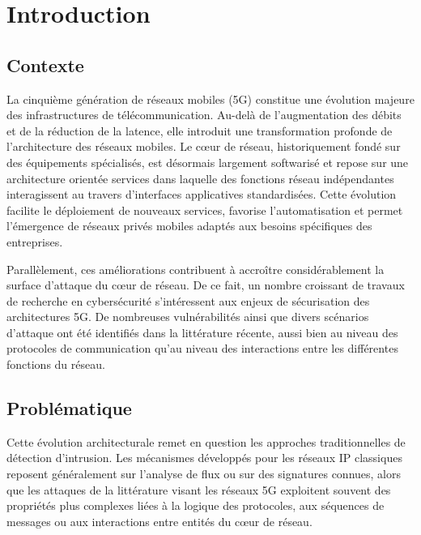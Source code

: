 \documentclass[a4paper,11pt,twoside]{StyleThese}
\begin{document}
\fi


\chapter*{Introduction}
\setcounter{chapter}{0}
\setcounter{section}{0}


\section*{Contexte}
La cinquième génération de réseaux mobiles (5G) constitue une évolution majeure des infrastructures de télécommunication. Au-delà de l’augmentation des débits et de la réduction de la latence, elle introduit une transformation profonde de l’architecture des réseaux mobiles. Le cœur de réseau, historiquement fondé sur des équipements spécialisés, est désormais largement softwarisé et repose sur une architecture orientée services dans laquelle des fonctions réseau indépendantes interagissent au travers d’interfaces applicatives standardisées. Cette évolution facilite le déploiement de nouveaux services, favorise l’automatisation et permet l’émergence de réseaux privés mobiles adaptés aux besoins spécifiques des entreprises.

Parallèlement, ces améliorations contribuent à accroître considérablement la surface d’attaque du cœur de réseau. De ce fait, un nombre croissant de travaux de recherche en cybersécurité s’intéressent aux enjeux de sécurisation des architectures 5G. De nombreuses vulnérabilités ainsi que divers scénarios d’attaque ont été identifiés dans la littérature récente, aussi bien au niveau des protocoles de communication qu’au niveau des interactions entre les différentes fonctions du réseau.

\section*{Problématique}
Cette évolution architecturale remet en question les approches traditionnelles de détection d’intrusion. Les mécanismes développés pour les réseaux IP classiques reposent généralement sur l’analyse de flux ou sur des signatures connues, alors que les attaques de la littérature visant les réseaux 5G exploitent souvent des propriétés plus complexes liées à la logique des protocoles, aux séquences de messages ou aux interactions entre entités du cœur de réseau.
\end{document}
